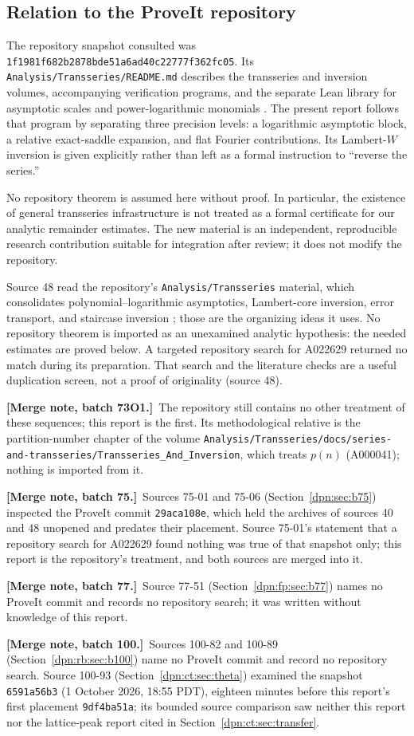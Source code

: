 \documentclass[11pt]{article}
\numberwithin{equation}{section}
\theoremstyle{definition}\newtheorem{definition}[theorem]{Definition}
\theoremstyle{remark}\newtheorem{remark}[theorem]{Remark}
\newcommand{\mergenote}[1]{\par\smallskip\noindent\textbf{[Merge note, batch 73O1.]}\ #1\par\smallskip}
\newcommand{\src}[1]{\textup{(source #1)}}
\newcommand{\file}[1]{\nolinkurl{#1}}
\newcommand{\mergenoteb}[1]{\par\smallskip\noindent\textbf{[Merge note, batch 75.]}\ #1\par\smallskip}
\newcommand{\mergenotec}[1]{\par\smallskip\noindent\textbf{[Merge note, batch 77.]}\ #1\par\smallskip}
\newcommand{\mergenoted}[1]{\par\smallskip\noindent\textbf{[Merge note, batch 100.]}\ #1\par\smallskip}
\begin{document}
\subsection{Relation to the ProveIt repository}
The repository snapshot consulted was
\texttt{1f1981f682b2878bde51a6ad40c22777f362fc05}.
Its \texttt{Analysis/Transseries/README.md} describes the transseries and
inversion volumes, accompanying verification programs, and the separate Lean
library for asymptotic scales and power-logarithmic monomials \cite{proveit}.
The present report follows that program by separating three precision levels:
a logarithmic asymptotic block, a relative exact-saddle expansion, and flat
Fourier contributions. Its Lambert-$W$ inversion is given explicitly rather
than left as a formal instruction to ``reverse the series.''

No repository theorem is assumed here without proof. In particular, the
existence of general transseries infrastructure is not treated as a formal
certificate for our analytic remainder estimates. The new material is an
independent, reproducible research contribution suitable for integration after
review; it does not modify the repository.

Source 48 read the repository's \file{Analysis/Transseries} material, which
consolidates polynomial--logarithmic asymptotics, Lambert-core inversion,
error transport, and staircase inversion \cite{proveit48}; those are the
organizing ideas it uses.  No repository theorem is imported as an unexamined
analytic hypothesis: the needed estimates are proved below.  A targeted
repository search for A022629 returned no match during its preparation.  That
search and the literature checks are a useful duplication screen, not a proof
of originality \src{48}.
\mergenote{The repository still contains no other treatment of these
sequences; this report is the first.  Its methodological relative is the
partition-number chapter of the volume
\file{Analysis/Transseries/docs/series-and-transseries/Transseries_And_Inversion},
which treats $p(n)$ (A000041); nothing is imported from it.}
\mergenoteb{Sources 75-01 and 75-06 (Section~\ref{dpn:sec:b75}) inspected the
ProveIt commit \texttt{29aca108e}, which held the archives of sources 40 and
48 unopened and predates their placement.  Source 75-01's statement that a
repository search for A022629 found nothing was true of that snapshot only;
this report is the repository's treatment, and both sources are merged into
it.}
\mergenotec{Source 77-51 (Section~\ref{dpn:fp:sec:b77}) names no ProveIt
commit and records no repository search; it was written without knowledge of
this report.}
\mergenoted{Sources 100-82 and 100-89 (Section~\ref{dpn:rb:sec:b100}) name no
ProveIt commit and record no repository search.  Source 100-93
(Section~\ref{dpn:ct:sec:theta}) examined the snapshot \texttt{6591a56b3}
(1 October 2026, 18:55 PDT), eighteen minutes before this report's first
placement \texttt{9df4ba51a}; its bounded source comparison saw neither this
report nor the lattice-peak report cited in Section~\ref{dpn:ct:sec:transfer}.}
\end{document}

